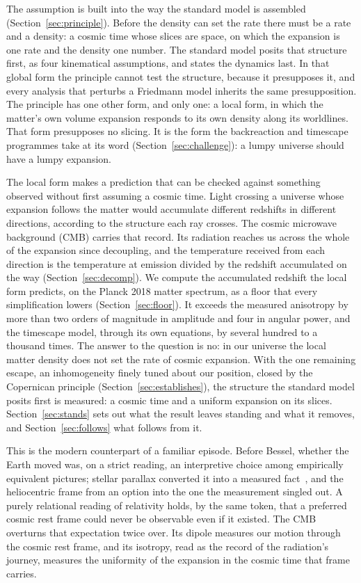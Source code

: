 \documentclass[twocolumn]{aastex701}
\begin{document}
The assumption is built into the way the standard model is assembled (Section~\ref{sec:principle}). Before the density can set the rate there must be a rate and a density: a cosmic time whose slices are space, on which the expansion is one rate and the density one number. The standard model posits that structure first, as four kinematical assumptions, and states the dynamics last. In that global form the principle cannot test the structure, because it presupposes it, and every analysis that perturbs a Friedmann model inherits the same presupposition. The principle has one other form, and only one: a local form, in which the matter's own volume expansion responds to its own density along its worldlines. That form presupposes no slicing. It is the form the backreaction and timescape programmes take at its word (Section~\ref{sec:challenge}): a lumpy universe should have a lumpy expansion.

The local form makes a prediction that can be checked against something observed without first assuming a cosmic time. Light crossing a universe whose expansion follows the matter would accumulate different redshifts in different directions, according to the structure each ray crosses. The cosmic microwave background (CMB) carries that record. Its radiation reaches us across the whole of the expansion since decoupling, and the temperature received from each direction is the temperature at emission divided by the redshift accumulated on the way (Section~\ref{sec:decomp}). We compute the accumulated redshift the local form predicts, on the Planck 2018 matter spectrum, as a floor that every simplification lowers (Section~\ref{sec:floor}). It exceeds the measured anisotropy by more than two orders of magnitude in amplitude and four in angular power, and the timescape model, through its own equations, by several hundred to a thousand times. The answer to the question is no: in our universe the local matter density does not set the rate of cosmic expansion. With the one remaining escape, an inhomogeneity finely tuned about our position, closed by the Copernican principle (Section~\ref{sec:establishes}), the structure the standard model posits first is measured: a cosmic time and a uniform expansion on its slices. Section~\ref{sec:stands} sets out what the result leaves standing and what it removes, and Section~\ref{sec:follows} what follows from it.

This is the modern counterpart of a familiar episode. Before Bessel, whether the Earth moved was, on a strict reading, an interpretive choice among empirically equivalent pictures; stellar parallax converted it into a measured fact~\citep{Bessel1838}, and the heliocentric frame from an option into the one the measurement singled out. A purely relational reading of relativity holds, by the same token, that a preferred cosmic rest frame could never be observable even if it existed. The CMB overturns that expectation twice over. Its dipole measures our motion through the cosmic rest frame, and its isotropy, read as the record of the radiation's journey, measures the uniformity of the expansion in the cosmic time that frame carries.
\end{document}
